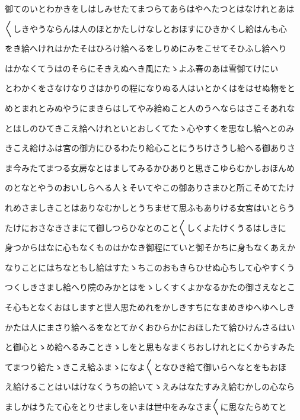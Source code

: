 \documentclass[a4paper,11pt,landscape]{ltjtarticle}
\begin{document}
\par\medskip
御てのいとわかきをしはしみせたてまつらてあらはやへたつとはなけれとあは
\par\medskip
〱しきやうならんは人のほとかたしけなしとおほすにひきかくし給はんも心
\par\medskip
をき給へけれはかたそはひろけ給へるをしりめにみをこせてそひふし給へり
\par\medskip
はかなくてうはのそらにそきえぬへき風にたゝよふ春のあは雪御てけにい
\par\medskip
とわかくをさなけなりさはかりの程になりぬる人はいとかくはをはせぬ物をと
\par\medskip
めとまれとみぬやうにまきらはしてやみ給ぬこと人のうへならはさこそあれな
\par\medskip
とはしのひてきこえ給へけれといとおしくてたゝ心やすくを思なし給へとのみ
\par\medskip
きこえ給けふは宮の御方にひるわたり給心ことにうちけさうし給へる御ありさ
\par\medskip
ま今みたてまつる女房なとはましてみるかひありと思きこゆらむかしおほんめ
\par\medskip
のとなとやうのおいしらへる人〻そいてやこの御ありさまひと所こそめてたけ
\par\medskip
れめさましきことはありなむかしとうちませて思ふもありける女宮はいとらう
\par\medskip
たけにおさなきさまにて御しつらひなとのこと〱しくよたけくうるはしきに
\par\medskip
身つからはなに心もなくものはかなき御程にていと御そかちに身もなくあえか
\par\medskip
なりことにはちなともし給はすたゝちこのおもきらひせぬ心ちして心やすくう
\par\medskip
つくしきさまし給へり院のみかとはをゝしくすくよかなるかたの御さえなとこ
\par\medskip
そ心もとなくおはしますと世人思ためれをかしきすちになまめきゆへゆへしき
\par\medskip
かたは人にまさり給へるをなとてかくおひらかにおほしたて給ひけんさるはい
\par\medskip
と御心とゝめ給へるみこときゝしをと思もなまくちおしけれとにくからすみた
\par\medskip
てまつり給たゝきこえ給ふまゝになよ〱となひき給て御いらへなとをもおほ
\par\medskip
え給けることはいはけなくうちの給いてゝえみはなたすみえ給むかしの心なら
\par\medskip
ましかはうたて心をとりせましをいまは世中をみなさま〱に思なたらめてと
\par\medskip
\end{document}
